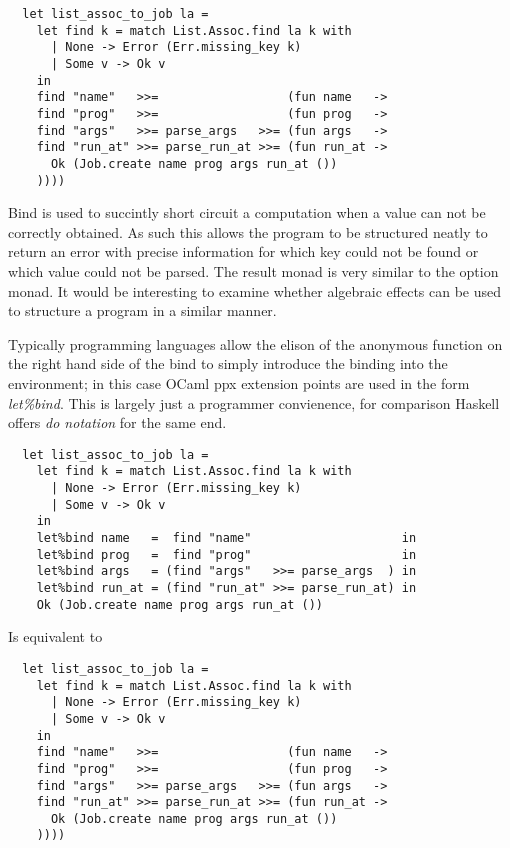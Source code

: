 \begin{verbatim}
  let list_assoc_to_job la =
    let find k = match List.Assoc.find la k with
      | None -> Error (Err.missing_key k)
      | Some v -> Ok v
    in
    find "name"   >>=                  (fun name   ->
    find "prog"   >>=                  (fun prog   ->
    find "args"   >>= parse_args   >>= (fun args   ->
    find "run_at" >>= parse_run_at >>= (fun run_at ->
      Ok (Job.create name prog args run_at ())
    ))))
\end{verbatim}

Bind is used to succintly short circuit a computation when a value can not be
correctly obtained. As such this allows the program to be structured neatly to return
an error with precise information for which key could not be found or which value could
not be parsed. The result monad is very similar to the option monad. It would be interesting
to examine whether algebraic effects can be used to structure a program in a similar manner.

Typically programming languages allow the elison of the anonymous function on the right hand side
of the bind to simply introduce the binding into the environment;
in this case OCaml ppx extension points are used in the form \textit{let\%bind}.
This is largely just a programmer convienence,
for comparison Haskell offers \textit{do notation} for the same end.

\begin{verbatim}
  let list_assoc_to_job la =
    let find k = match List.Assoc.find la k with
      | None -> Error (Err.missing_key k)
      | Some v -> Ok v
    in
    let%bind name   =  find "name"                     in
    let%bind prog   =  find "prog"                     in
    let%bind args   = (find "args"   >>= parse_args  ) in
    let%bind run_at = (find "run_at" >>= parse_run_at) in
    Ok (Job.create name prog args run_at ())
\end{verbatim}
Is equivalent to
\begin{verbatim}
  let list_assoc_to_job la =
    let find k = match List.Assoc.find la k with
      | None -> Error (Err.missing_key k)
      | Some v -> Ok v
    in
    find "name"   >>=                  (fun name   ->
    find "prog"   >>=                  (fun prog   ->
    find "args"   >>= parse_args   >>= (fun args   ->
    find "run_at" >>= parse_run_at >>= (fun run_at ->
      Ok (Job.create name prog args run_at ())
    ))))
\end{verbatim}


